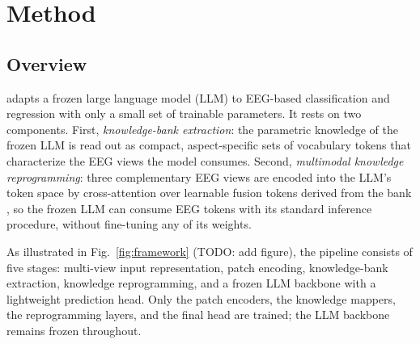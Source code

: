 
\section{Method}
\label{sec:method}


\subsection{Overview}
\label{sec:method-overview}

\modelname adapts a frozen large language model (LLM) to EEG-based
classification and regression with only a small set of trainable parameters.
It rests on two components. First, \emph{knowledge-bank extraction}: the
parametric knowledge of the frozen LLM is read out as compact, aspect-specific
sets of vocabulary tokens that characterize the EEG views the model consumes.
Second, \emph{multimodal knowledge reprogramming}: three complementary EEG
views are encoded into the LLM's token space by cross-attention over learnable
fusion tokens derived from the bank
, so the frozen LLM can consume EEG tokens with its
standard inference procedure, without fine-tuning any of its weights.

As illustrated in Fig.~\ref{fig:framework} (TODO: add figure), the pipeline
consists of five stages: multi-view input representation, patch encoding,
knowledge-bank extraction, knowledge reprogramming, and a frozen LLM backbone
with a lightweight prediction head. Only the patch encoders, the knowledge
mappers, the reprogramming layers, and the final head are trained; the LLM
backbone remains frozen throughout.


